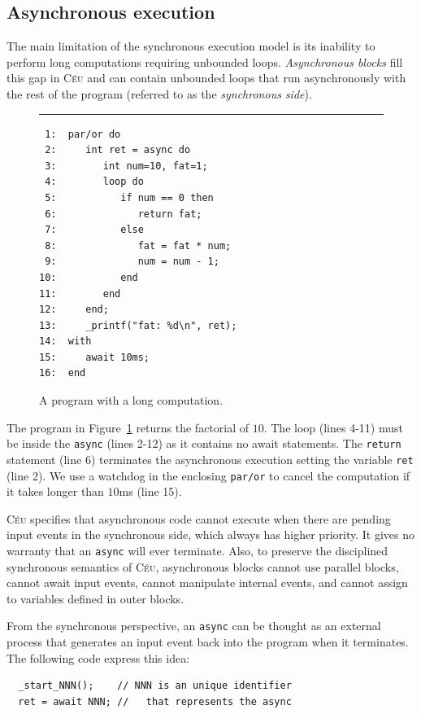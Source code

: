\documentclass{sigplan-proc}
\newcommand{\2}{\;\;}
\newcommand{\5}{\;\;\;\;\;}
\newcommand{\CEU}{\textsc{C\'{e}u}}
\newcommand{\code}[1] {{\small{\texttt{#1}}}}
\begin{document}
\subsection{Asynchronous execution}
\label{sec:ceu:async}

The main limitation of the synchronous execution model is its inability to 
perform long computations requiring unbounded loops.
\emph{Asynchronous blocks} fill this gap in \CEU{} and can contain unbounded 
loops that run asynchronously with the rest of the program (referred to as the 
\emph{synchronous side}).

\begin{figure}[t]
\rule{8.5cm}{0.37pt}
{\small
\begin{verbatim}
 1:  par/or do
 2:     int ret = async do
 3:        int num=10, fat=1;
 4:        loop do
 5:           if num == 0 then
 6:              return fat;
 7:           else
 8:              fat = fat * num;
 9:              num = num - 1;
10:           end
11:        end
12:     end;
13:     _printf("fat: %d\n", ret);
14:  with
15:     await 10ms;
16:  end
\end{verbatim}
}
\caption{ A program with a long computation.
\label{lst:ceu:async}
}
\end{figure}

The program in Figure~\ref{lst:ceu:async} returns the factorial of $10$.
The loop (lines 4-11) must be inside the \code{async} (lines 2-12) as it 
contains no await statements.
The \code{return} statement (line 6) terminates the asynchronous execution 
setting the variable \code{ret} (line 2).
We use a watchdog in the enclosing \code{par/or} to cancel the computation if 
it takes longer than $10$ms (line 15).

\CEU{} specifies that asynchronous code cannot execute when there are pending 
input events in the synchronous side, which always has higher priority.
It gives no warranty that an \code{async} will ever terminate.
Also, to preserve the disciplined synchronous semantics of \CEU{}, asynchronous 
blocks cannot use parallel blocks, cannot await input events, cannot manipulate 
internal events, and cannot assign to variables defined in outer blocks.

From the synchronous perspective, an \code{async} can be thought as an external 
process that generates an input event back into the program when it terminates.
The following code express this idea:

{\small
\begin{verbatim}
  _start_NNN();    // NNN is an unique identifier
  ret = await NNN; //   that represents the async
\end{verbatim}
}
\end{document}
